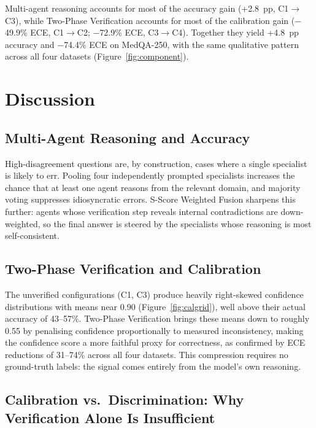 \documentclass[10pt]{article}
\begin{document}
Multi-agent reasoning accounts for most of the accuracy gain (+2.8~pp, C1$\to$C3),
while Two-Phase Verification accounts for most of the calibration gain
($-$49.9\% ECE, C1$\to$C2; $-$72.9\% ECE, C3$\to$C4).  Together they yield
+4.8~pp accuracy and $-$74.4\% ECE on MedQA-250, with the same qualitative
pattern across all four datasets (Figure~\ref{fig:component}).

\section{Discussion}
\label{sec:discussion}

\subsection{Multi-Agent Reasoning and Accuracy}

High-disagreement questions are, by construction, cases where a single
specialist is likely to err.  Pooling four independently prompted specialists
increases the chance that at least one agent reasons from the relevant domain,
and majority voting suppresses idiosyncratic errors.  S-Score Weighted Fusion
sharpens this further: agents whose verification step reveals internal
contradictions are down-weighted, so the final answer is steered by the
specialists whose reasoning is most self-consistent.

\subsection{Two-Phase Verification and Calibration}

The unverified configurations (C1, C3) produce heavily right-skewed
confidence distributions with means near 0.90 (Figure~\ref{fig:calgrid}),
well above their actual accuracy of 43--57\%.  Two-Phase Verification brings
these means down to roughly 0.55 by penalising confidence proportionally to
measured inconsistency, making the confidence score a more faithful proxy for
correctness, as confirmed by ECE reductions of 31--74\% across all four
datasets.  This compression requires no ground-truth labels: the
signal comes entirely from the model's own reasoning.

\subsection{Calibration vs.\ Discrimination: Why Verification Alone Is Insufficient}
\label{sec:disc_discrimination}
\end{document}
